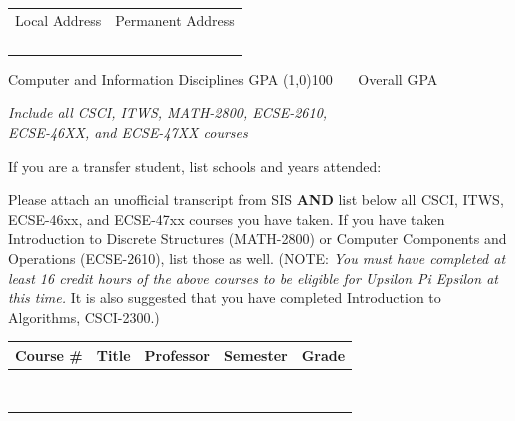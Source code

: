 \documentclass{article}
\begin{document}
\begin{tabularx}{\textwidth}{XX}
Local Address  & Permanent Address \\
\hrulefill & \hrulefill \\
\hrulefill & \hrulefill \\
\hrulefill & \hrulefill \\
\hrulefill & \hrulefill \\
\end{tabularx}

\vspace*{0.5in}

Computer and Information Disciplines GPA \line(1,0){100} \ \ \ Overall GPA \hrulefill

\footnotesize{\emph{Include all CSCI, ITWS, MATH-2800, ECSE-2610, \\ ECSE-46XX, and ECSE-47XX courses}}


\normalsize
\vspace*{0.5in}


If you are a transfer student, list schools and years attended:

\vspace*{0.2in}

\hrulefill


\newpage \vspace*{0.1in}

Please attach an unofficial transcript from SIS \textbf{AND} list below all CSCI, ITWS, ECSE-46xx, and ECSE-47xx courses you have taken.
If you have taken Introduction to Discrete Structures (MATH-2800) or Computer Components and Operations (ECSE-2610), list those as well.
(NOTE: \emph{You must have completed at least 16 credit hours of the above courses to be eligible for Upsilon Pi Epsilon at this time.}
It is also suggested that you have completed Introduction to Algorithms, CSCI-2300.)

\vspace*{0.2in} 

\begin{tabularx}{\textwidth}{|l|X|X|c|c|} \hline
\textbf{Course \#} & \textbf{Title} & \textbf{Professor} & \textbf{Semester} & \textbf{Grade} \\ \hline
 & & & & \\ \hline
 & & & & \\ \hline
 & & & & \\ \hline 
 & & & & \\ \hline 
 & & & & \\ \hline 
 & & & & \\ \hline 
 & & & & \\ \hline 
 & & & & \\ \hline
\end{tabularx}
\end{document}

